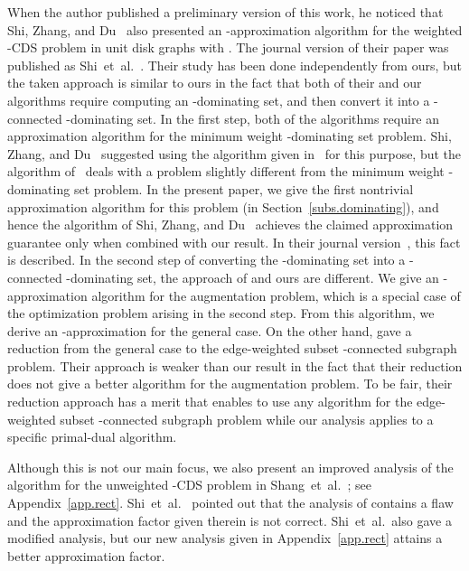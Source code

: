 \documentclass[11pt]{article}
\begin{document}
When the author published a preliminary version \cite{Fukunaga15arxiv} of this work,
he noticed that
Shi, Zhang, and Du~\cite{ShiZD15} also presented an -approximation
algorithm for the weighted -CDS problem in unit disk graphs with
.
The journal version of their paper was published as Shi~et~al.\ \cite{ShiZMD17}.
Their study has been done independently from ours,
but the taken approach is similar to ours
in the fact that
both of their and our algorithms require
computing an -dominating set,
and then convert it into a -connected -dominating set.
In the first step,
both of the algorithms require
an approximation algorithm for the minimum weight -dominating
set problem.
Shi, Zhang, and Du~\cite{ShiZD15}  suggested using the algorithm
given in~\cite{WillsonZWD15} for this purpose, but
the algorithm of~\cite{WillsonZWD15} 
deals with a problem slightly different from the minimum weight -dominating set problem.
In the present paper, we give the first nontrivial approximation
algorithm for this problem (in Section~\ref{subs.dominating}),
and hence
the algorithm of Shi, Zhang, and Du~\cite{ShiZD15}
achieves the claimed approximation guarantee only when combined with our result.
In their journal version~\cite{ShiZMD17},
this fact is described.
In the second step of converting the -dominating set into a
-connected -dominating set,
the approach of  \cite{ShiZD15,ShiZMD17}
and ours are different.
We give an -approximation algorithm for
 the augmentation
 problem,
 which is a special case of the optimization problem arising in the
 second step.
 From this algorithm, we derive an -approximation for the general
 case.
 On the other hand,  \cite{ShiZD15,ShiZMD17} gave a reduction from the general case
 to the edge-weighted subset -connected subgraph problem.
 Their approach is weaker than our result
 in the fact that their reduction does not give a better algorithm for the
 augmentation problem.
 To be fair, their reduction approach has a merit that
  enables to use any algorithm for the edge-weighted subset -connected subgraph problem
 while our analysis applies to a specific primal-dual algorithm.



Although this is not our main focus, 
we also present an improved analysis of the algorithm for the unweighted
-CDS problem 
in Shang~et~al.~\cite{Shang:2007jg};
see Appendix~\ref{app.rect}.
Shi~et~al.~\cite{ShiZZW16} pointed out that the analysis of \cite{Shang:2007jg}
contains a flaw and the approximation factor given therein is not correct.
Shi~et~al.\ also gave a modified analysis, but our new analysis given in
Appendix~\ref{app.rect} attains a 
better approximation factor.
\end{document}
